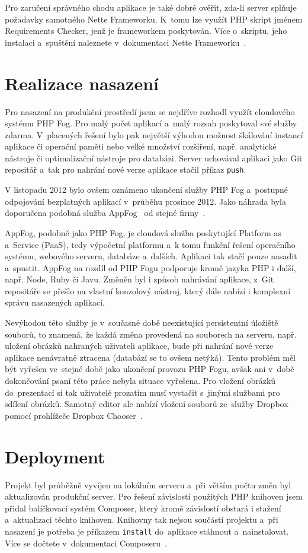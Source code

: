 \documentclass[11pt,twoside,a4paper]{book}
\newcommand*{\nomExpl}[2]{#2 (#1)\nomenclature{#1}{#2}} 	%
\begin{document}
Pro zaručení správného chodu aplikace je také dobré ověřit, zda-li server splňuje požadavky samotného Nette Frameworku. K~tomu lze využít PHP skript jménem Requirements Checker, jenž je frameworkem poskytován. Více o~skriptu, jeho instalaci a~spuštění naleznete v~dokumentaci Nette Frameworku~\cite{checker}.

\section{Realizace nasazení}
Pro nasazení na produkční prostředí jsem se nejdříve rozhodl využít cloudového systému PHP Fog. Pro malý počet aplikací a~malý rozsah poskytoval své služby zdarma. V~placených řešení bylo pak největší výhodou možnost škálování instancí aplikace či operační paměti nebo velké množství rozšíření, např. analytické nástroje či optimalizační nástroje pro databázi. Server uchovával aplikaci jako Git repositář a~tak pro nahrání nové verze aplikace stačil příkaz \verb|push|.

V listopadu 2012 bylo ovšem oznámeno ukončení služby PHP Fog a~postupné odpojování bezplatných aplikací v~průběhu prosince 2012. Jako náhrada byla doporučena podobná služba AppFog~\cite{appfog} od stejné firmy~\cite{phpfogdiscont}.

AppFog, podobně jako PHP Fog, je cloudová služba poskytující \nomExpl{PaaS}{Platform as a~Service}, tedy výpočetní platformu a~k tomu funkční řešení operačního systému, webového serveru, databáze a~dalších. Aplikaci tak stačí pouze nasadit a~spustit. AppFog na rozdíl od PHP Fogu podporuje kromě jazyka PHP i další, např. Node, Ruby či Javu. Změněn byl i způsob nahrávání aplikace, z~Git repositáře se přešlo na vlastní konzolový nástroj, který dále nabízí i komplexní správu nasazených aplikací.

Nevýhodou této služby je v~současné době neexistující persistentní úložiště souborů, to znamená, že každá změna provedená na souborech na serveru, např. uložení obrázků nahraných uživateli aplikace, bude při nahrání nové verze aplikace nenávratně ztracena (databází se to ovšem netýká). Tento problém měl být vyřešen ve~stejné době jako ukončení provozu PHP Fogu, avšak ani v~době dokončování psaní této práce nebyla situace vyřešena. Pro vložení obrázků do~prezentací si tak uživatelé prozatím musí vystačit s~jinými službami pro sdílení obrázků. Samotný editor ale nabízí vložení souborů ze~služby Dropbox pomocí prohlížeče Dropbox Chooser~\cite{dropboxchooser}.

\section{Deployment}
Projekt byl průběžně vyvíjen na lokálním serveru a~při větším počtu změn byl aktualizován produkční server. Pro řešení závislostí použitých PHP knihoven jsem přidal balíčkovací systém Composer, který kromě závislostí obstará i stažení a~aktualizaci těchto knihoven. Knihovny tak nejsou součástí projektu a~při nasazení je potřeba je příkazem \verb|install| do~aplikace stáhnout a~nainstalovat. Více se dočtete v~dokumentaci Composeru~\cite{composer}.
\end{document}
